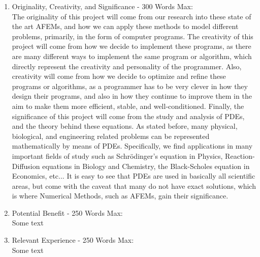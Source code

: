 \documentclass[11pt]{article}
\begin{document}
\begin{enumerate}
\item Originality, Creativity, and Significance - 300 Words Max: \\
The originality of this project will come from our research into these state of the art AFEMs, and how we can apply these methods to model different problems,
primarily, in the form of computer programs. The creativity of this project will come from how we decide to implement these programs, as there
are many different ways to implement the same program or algorithm, which directly represent the creativity and personality of the programmer.
Also, creativity will come from how we decide to optimize and refine these programs or algorithms, as a programmer has to be very clever in how they
design their programs, and also in how they continue to improve them in the aim to make them more efficient, stable, and well-conditioned.
Finally, the significance of this project will come from the study and analysis of PDEs, and the theory behind these equations. As stated before, many physical, biological, and engineering related
problems can be represented mathematically by means of PDEs. Specifically, we find applications in many important fields of study such as Schrödinger's equation in Physics,
Reaction-Diffusion equations in Biology and Chemistry, the Black-Scholes equation in Economics, etc... It is easy to see that PDEs are used in basically all scientific areas,
but come with the caveat that many do not have exact solutions, which is where Numerical Methods, such as AFEMs, gain their significance.


\item Potential Benefit - 250 Words Max: \\
Some text

\item Relevant Experience - 250 Words Max: \\
Some text

\end{enumerate}
\end{document}
